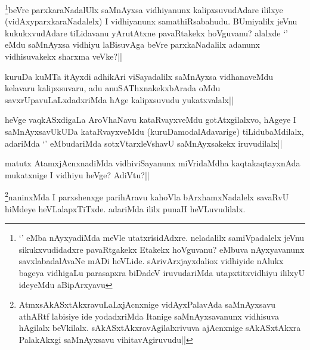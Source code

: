 \begin{artha}
\footnote{`\stext' eMba nAyxyadiMda meVle utatxrisidAdxre. neladalilx samiVpadalelx jeVnu sikukxvudidadxre pavaRtgakekx Etakekx hoVguvanu? eMbuva nAyxyavanunx savxlabadalAvaNe mADi heVLide. sArivArxjayxdaliox vidhiyide nAlukx bageya vidhigaLu parasapxra biDadeV iruvudariMda utapxtitxvidhiyu ililxyU ideyeMdu aBipArxyavu}beVre parxkaraNadalUlx saMnAyxsa vidhiyanunx kalipxsuvudAdare ililxye (vidAxyparxkaraNadalelx) I vidhiyanunx samathiRsabahudu. BUmiyalilx jeVnu kukukxvudAdare tiLidavanu yArutAtxne pavaRtakekx hoVguvanu? alalxde `\stext' eMdu saMnAyxsa vidhiyu laBisuvAga beVre parxkaNadalilx adanunx vidhisuvakekx sharxma veVke?||
\end{artha}


\begin{artha}
kuruDa kuMTa itAyxdi adhikAri viSayadalilx saMnAyxsa vidhanaveMdu kelavaru kalipxsuvaru, adu anuSAThxnakekxbArada oMdu savxrUpavuLaLxdadxriMda hAge kalipxsuvudu yukatxvalalx||
\end{artha}


\begin{artha}
heVge vaqkASxdigaLa AroVhaNavu kataRvayxveMdu gotAtxgilalxvo, hAgeye I saMnAyxsavUkUDa kataRvayxveMdu (kuruDamodalAdavarige) tiLidubaMdilalx, adariMda `\stext' eMbudariMda sotxVtarxleVshavU saMnAyxsakekx iruvudilalx||
\end{artha}


\begin{artha}
matutx AtamxjAcnxnadiMda vidhiviSayanunx miVridaMdha kaqtakaqtayxnAda mukatxnige I vidhiyu heVge? AdiVtu?||
\end{artha}

\begin{artha}
\footnote{AtmxsAkASxtAkxravuLaLxjAcnxnige vidAyxPalavAda saMnAyxsavu athARtf labisiye ide yodadxriMda Itanige saMnAyxsavanunx vidhisuva hAgilalx beVkilalx. sAkASxtAkxravAgilalxrivuva ajAcnxnige sAkASxtAkxra PalakAkxgi saMnAyxsavu vihitavAgiruvudu||}naninxMda I parxshenxge parihAravu kahoVla bArxhamxNadalelx savaRvU hiMdeye heVLalapxTiTxde. adariMda ililx punaH heVLuvudilalx.
\end{artha}

